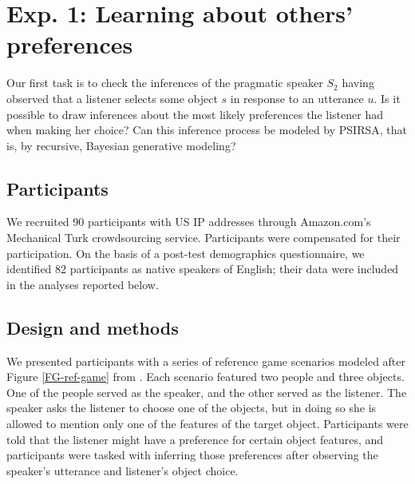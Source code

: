 \documentclass[10pt,a4paper]{article}
\begin{document}
\section{Exp. 1: Learning about others' preferences}

Our first task is to check the inferences of the pragmatic speaker $S_2$ having observed that a listener selects some object $s$ in response to an utterance $u$. 
Is it possible to draw inferences about the most likely preferences the listener had when making her choice? 
Can this inference process be modeled by PSIRSA, that is, by recursive, Bayesian generative modeling?

\subsection{Participants}

We recruited 90 participants with US IP addresses through Amazon.com's Mechanical Turk crowdsourcing service. Participants were compensated for their participation. On the basis of a post-test demographics questionnaire, we identified 82 participants as native speakers of English; their data were included in the analyses reported below.

\subsection{Design and methods}

We presented participants with a series of reference game scenarios modeled after Figure \ref{FG-ref-game} from . Each scenario featured two people and three objects. One of the people served as the speaker, and the other served as the listener. The speaker asks the listener to choose one of the objects, but in doing so she is allowed to mention only one of the features of the target object. Participants were told that the listener might have a preference for certain object features, and participants were tasked with inferring those preferences after observing the speaker's utterance and listener's object choice.
\end{document}

